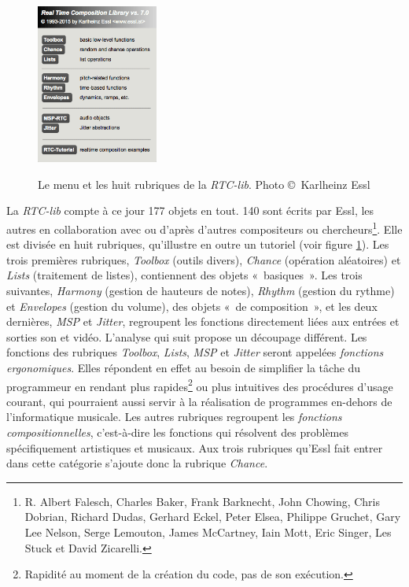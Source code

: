 \documentclass[a4paper,12pt]{article}
\newcommand{\guill}[1]{«~#1~»}
\begin{document}
\begin{figure}[h!]
\begin{center}
\includegraphics[width=4cm]{images/rtcmenu.png}
\label{rtcmenu}
\caption{\footnotesize Le menu et les huit rubriques de la \emph{RTC-lib}. Photo \copyright~Karlheinz Essl}
\end{center}
\end{figure}

La \emph{RTC-lib} compte à ce jour 177 objets en tout. 140 sont écrits par Essl, les autres en collaboration avec ou d'après d'autres compositeurs ou chercheurs\footnote{R. Albert Falesch, Charles Baker, Frank Barknecht, John Chowing, Chris Dobrian, Richard Dudas, Gerhard Eckel, Peter Elsea, Philippe Gruchet, Gary Lee Nelson, Serge Lemouton, James McCartney, Iain Mott, Eric Singer, Les Stuck et David Zicarelli.}. Elle est divisée en huit rubriques, qu'illustre en outre un tutoriel (voir figure \ref{rtcmenu}). Les trois premières rubriques, \emph{Toolbox} (outils divers), \emph{Chance} (opération aléatoires) et \emph{Lists} (traitement de listes), contiennent des objets \guill{basiques}. Les trois suivantes, \emph{Harmony} (gestion de hauteurs de notes), \emph{Rhythm} (gestion du rythme) et \emph{Envelopes} (gestion du volume), des objets \guill{de composition}, et les deux dernières, \emph{MSP} et \emph{Jitter}, regroupent les fonctions directement liées aux entrées et sorties son et vidéo. L'analyse qui suit propose un découpage différent. Les fonctions des rubriques \emph{Toolbox}, \emph{Lists}, \emph{MSP} et \emph{Jitter} seront appelées \emph{fonctions ergonomiques}. Elles répondent en effet au besoin de simplifier la tâche du programmeur en rendant plus rapides\footnote{Rapidité au moment de la création du code, pas de son exécution.} ou plus intuitives des procédures d'usage courant, qui pourraient aussi servir à la réalisation de programmes en-dehors de l'informatique musicale. Les autres rubriques regroupent les \emph{fonctions compositionnelles}, c'est-à-dire les fonctions qui résolvent des problèmes spécifiquement artistiques et musicaux. Aux trois rubriques qu'Essl fait entrer dans cette catégorie s'ajoute donc la rubrique \emph{Chance}.
\end{document}
